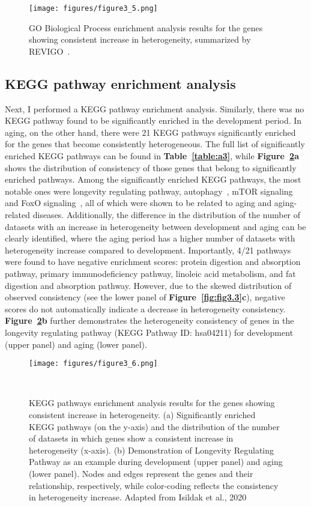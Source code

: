 \begin{landscape}
\begin{figure}[h]
    \centering
    \texttt{[image: figures/figure3\_5.png]}
    \caption{GO Biological Process enrichment analysis results for the genes showing consistent increase in heterogeneity, summarized by REVIGO~\cite{Supek2011}.}
    \label{fig:fig3.5}
\end{figure}
\end{landscape}

\subsection{KEGG pathway enrichment analysis}
Next, I performed a KEGG pathway enrichment analysis. 
Similarly, there was no KEGG pathway found to be significantly enriched in the development period.
In aging, on the other hand, there were 21 KEGG pathways significantly enriched for the genes that become consistently heterogeneous. 
The full list of significantly enriched KEGG pathways can be found in \textbf{Table~\ref{table:a3}},
while \textbf{Figure~\ref{fig:fig3.6}a} shows the distribution of consistency of those genes that belong to significantly enriched pathways. 
Among the significantly enriched KEGG pathways, the most notable ones were longevity regulating pathway, autophagy~\cite{Rubinsztein2011}, mTOR signaling~\cite{Johnson2013} and FoxO signaling~\cite{Martins2016}, 
all of which were shown to be related to aging and aging-related diseases.
Additionally, the difference in the distribution of the number of datasets with an increase in heterogeneity between development and aging can be clearly identified,
where the aging period has a higher number of datasets with heterogeneity increase compared to development.
Importantly, 4/21 pathways were found to have negative enrichment scores: protein digestion and absorption pathway, primary immunodeficiency pathway, linoleic acid metabolism, and fat digestion and absorption pathway.
However, due to the skewed distribution of observed consistency (see the lower panel of \textbf{Figure~\ref{fig:fig3.3}c}), 
negative scores do not automatically indicate a decrease in heterogeneity consistency. \textbf{Figure~\ref{fig:fig3.6}b} further demonstrates the heterogeneity consistency of genes in the longevity regulating pathway 
(KEGG Pathway ID: hsa04211) for development (upper panel) and aging (lower panel).

\begin{figure}[h]
    \centering
    \texttt{[image: figures/figure3\_6.png]}
    \caption{KEGG pathways enrichment analysis results for the genes showing consistent increase in heterogeneity.
    (a) Significantly enriched KEGG pathways (on the y-axis) and the distribution of the number of datasets in which genes show a consistent increase in heterogeneity (x-axis). 
    (b) Demonstration of Longevity Regulating Pathway as an example during development (upper panel) and aging (lower panel). 
    Nodes and edges represent the genes and their relationship, respectively, while color-coding reflects the consistency in heterogeneity increase.
    Adapted from Isildak et al., 2020
    }~\label{fig:fig3.6}
\end{figure}

